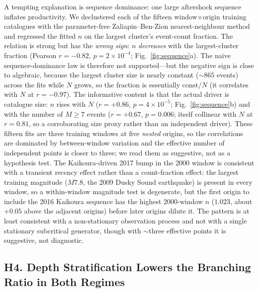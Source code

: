 A tempting explanation is sequence dominance: one large aftershock sequence
inflates productivity. We declustered each of the fifteen window$\times$origin
training catalogues with the parameter-free Zaliapin--Ben-Zion nearest-neighbour
method and regressed the fitted $n$ on the largest cluster's event-count fraction.
The relation is strong but has the \emph{wrong sign}: $n$ \emph{decreases} with
the largest-cluster fraction (Pearson $r=-0.82$, $p=2\times10^{-4}$;
Fig.~\ref{fig:sequence}a). The naive sequence-dominance law is therefore not
supported---but the negative sign is close to algebraic, because the largest
cluster size is nearly constant ($\sim865$ events) across the fits while $N$ grows,
so the fraction is essentially $\mathrm{const}/N$ (it correlates with $N$ at
$r=-0.97$). The informative content is that the actual driver is catalogue size:
$n$ rises with $N$ ($r=+0.86$, $p=4\times10^{-5}$; Fig.~\ref{fig:sequence}b) and
with the number of $M\!\ge\!7$ events ($r=+0.67$, $p=0.006$; itself collinear with
$N$ at $r=0.81$, so a corroborating size proxy rather than an independent driver).
These fifteen fits are three training windows at five \emph{nested} origins, so the
correlations are dominated by between-window variation and the effective number of
independent points is closer to three; we read them as suggestive, not as a
hypothesis test. The Kaikoura-driven 2017 bump in the 2000 window is consistent
with a transient recency effect rather than a count-fraction effect: the largest
training magnitude ($M7.8$, the 2009 Dusky Sound earthquake) is present in every
window, so a within-window magnitude test is degenerate, but the first origin to
include the 2016 Kaikoura sequence has the highest 2000-window $n$ ($1.023$, about
$+0.05$ above the adjacent origins) before later origins dilute it. The
pattern is at least consistent with a non-stationary observation process and not
with a single stationary subcritical generator, though with $\sim$three effective
points it is suggestive, not diagnostic.

\subsection*{H4. Depth Stratification Lowers the Branching Ratio in Both Regimes}

